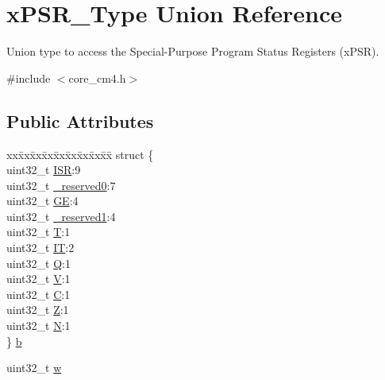 \hypertarget{unionx_p_s_r___type}{}\section{x\+P\+S\+R\+\_\+\+Type Union Reference}
\label{unionx_p_s_r___type}


Union type to access the Special-\/\+Purpose Program Status Registers (x\+P\+SR).  




{\ttfamily \#include $<$core\+\_\+cm4.\+h$>$}

\subsection*{Public Attributes}
\begin{DoxyCompactItemize}
\item 
\begin{tabbing}
xx\=xx\=xx\=xx\=xx\=xx\=xx\=xx\=xx\=\kill
struct \{\\
\>uint32\_t \hyperlink{unionx_p_s_r___type_a3e9120dcf1a829fc8d2302b4d0673970}{ISR}:9\\
\>uint32\_t \hyperlink{unionx_p_s_r___type_af438e0f407357e914a70b5bd4d6a97c5}{\_reserved0}:7\\
\>uint32\_t \hyperlink{unionx_p_s_r___type_a2d0ec4ccae337c1df5658f8cf4632e76}{GE}:4\\
\>uint32\_t \hyperlink{unionx_p_s_r___type_a790056bb6f20ea16cecc784b0dd19ad6}{\_reserved1}:4\\
\>uint32\_t \hyperlink{unionx_p_s_r___type_a7eed9fe24ae8d354cd76ae1c1110a658}{T}:1\\
\>uint32\_t \hyperlink{unionx_p_s_r___type_a3200966922a194d84425e2807a7f1328}{IT}:2\\
\>uint32\_t \hyperlink{unionx_p_s_r___type_add7cbd2b0abd8954d62cd7831796ac7c}{Q}:1\\
\>uint32\_t \hyperlink{unionx_p_s_r___type_af14df16ea0690070c45b95f2116b7a0a}{V}:1\\
\>uint32\_t \hyperlink{unionx_p_s_r___type_a40213a6b5620410cac83b0d89564609d}{C}:1\\
\>uint32\_t \hyperlink{unionx_p_s_r___type_a1e5d9801013d5146f2e02d9b7b3da562}{Z}:1\\
\>uint32\_t \hyperlink{unionx_p_s_r___type_a2db9a52f6d42809627d1a7a607c5dbc5}{N}:1\\
\} \hyperlink{unionx_p_s_r___type_a3b1063bb5cdad67e037cba993b693b70}{b}\\

\end{tabbing}\item 
uint32\+\_\+t \hyperlink{unionx_p_s_r___type_a1a47176768f45f79076c4f5b1b534bc2}{w}
\end{DoxyCompactItemize}


